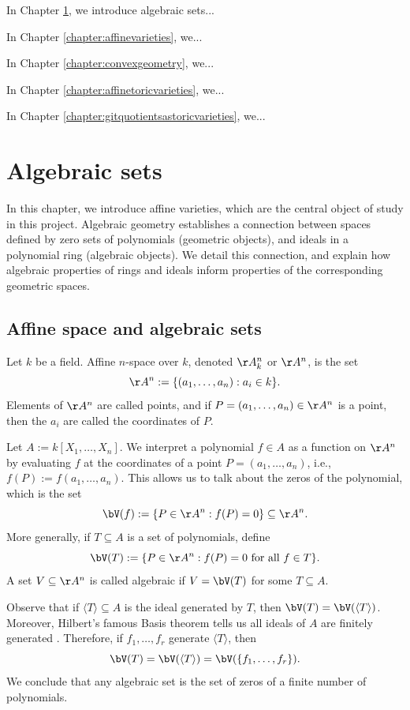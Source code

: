 \documentclass[12pt]{amsart}
\theoremstyle{plain}
\begin{document}
In Chapter \ref{chapter:algebraicsets}, we introduce algebraic sets...

In Chapter \ref{chapter:affinevarieties}, we...

In Chapter \ref{chapter:convexgeometry}, we...

In Chapter \ref{chapter:affinetoricvarieties}, we...

In Chapter \ref{chapter:gitquotientsastoricvarieties}, we...

\newpage
{}
\section{Algebraic sets}\label{chapter:algebraicsets}
In this chapter, we introduce affine varieties, which are the central object of study in this project.
Algebraic geometry establishes a connection between spaces defined by zero sets of polynomials (geometric objects), and ideals in a polynomial ring (algebraic objects).
We detail this connection, and explain how algebraic properties of rings and ideals inform properties of the corresponding geometric spaces.





\subsection{Affine space and algebraic sets}
Let $k$ be a field.
Affine $n$-space over $k$, denoted $\AA^n_k$ or $\AA^n$, is the set 
$$\AA^n := \{(a_1, \ldots, a_n) : a_i \in k\}.$$
Elements of $\AA^n$ are called points, and if $P = (a_1, \ldots, a_n) \in \AA^n$ is a point, then the $a_i$ are called the coordinates of $P$.

Let $A := k[X_1, \ldots, X_n]$.
We interpret a polynomial $f \in A$ as a function on $\AA^n$ by evaluating $f$ at the coordinates of a point $P = (a_1, \ldots, a_n)$, i.e., $f(P) := f(a_1, \ldots, a_n).$
This allows us to talk about the zeros of the polynomial, which is the set
$$\bV(f) := \{P \in \AA^n : f(P) = 0\} \subseteq \AA^n.$$
More generally, if $T \subseteq A$ is a set of polynomials, define
$$\bV(T) := \{P \in \AA^n : f(P) = 0 \text{ for all } f \in T\}.$$
A set $V \subseteq \AA^n$ is called algebraic if $V = \bV(T)$ for some $T \subseteq A$.

Observe that if $\langle T \rangle \subseteq A$ is the ideal generated by $T$, then $\bV(T) = \bV(\langle T \rangle)$.
Moreover, Hilbert's famous Basis theorem tells us all ideals of $A$ are finitely generated \cite[\S 3.6]{Reid95}.
Therefore, if $f_1, \ldots, f_r$ generate $\langle T \rangle$, then 
$$\bV(T) = \bV(\langle T \rangle) = \bV(\{f_1, \ldots, f_r\}).$$
We conclude that any algebraic set is the set of zeros of a finite number of polynomials.
\end{document}
